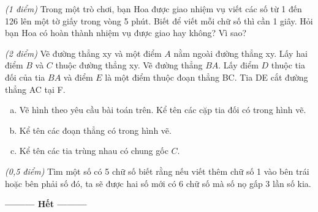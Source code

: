\begin{ex}
\begin{enumerate}[a)]
\end{enumerate}
\end{ex}    \begin{ex} \textit{(1 điểm)} Trong một trò chơi, bạn Hoa được giao nhiệm vụ viết các số từ 1 đến 126 lên một tờ giấy trong vòng 5 phút. Biết để viết mỗi chữ số thì cần 1 giây. Hỏi bạn Hoa có hoàn thành nhiệm vụ được giao hay không? Vì sao?\\
\end{ex}    \begin{ex}  \textit{(2 điểm)} Vẽ đường thẳng xy và một điểm $A$ nằm ngoài đường thẳng xy. Lấy hai điểm $B$ và $C$ thuộc đường thẳng xy. Vẽ đường thẳng $BA$. Lấy điểm $D$ thuộc tia đối của tia $BA$ và điểm $E$ là một điểm thuộc đoạn thẳng BC. Tia DE cắt đường thẳng AC tại F.
 \begin{enumerate}[a)]
\item Vẽ hình theo yêu cầu bài toán trên. Kể tên các cặp tia đối có trong hình vẽ.
\item Kể tên các đoạn thẳng có trong hình vẽ.
\item Kể tên các tia trùng nhau có chung gốc $C$.

\end{enumerate}
\end{ex}    \begin{ex} \textit{(0,5 điểm)} Tìm một số có 5 chữ số biết rằng nếu viết thêm chữ số 1 vào bên trái hoặc bên phải số đó, ta sẽ được hai số mới có 6 chữ số mà số nọ gấp 3 lần số kia.
\end{ex}
\begin{center}
\textbf{\textbf{---------} Hết \textbf{---------}}
\end{center}